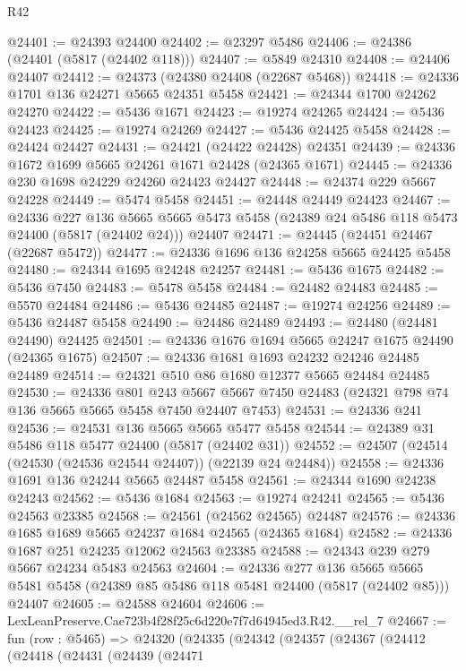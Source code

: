 \begin{lexlean}{R42}
\begin{coremodule}
@24401 := @24393 @24400
@24402 := @23297 @5486
@24406 := @24386 (@24401 (@5817 (@24402 @118)))
@24407 := @5849 @24310
@24408 := @24406 @24407
@24412 := @24373 (@24380 @24408 (@22687 @5468))
@24418 := @24336 @1701 @136 @24271 @5665 @24351 @5458
@24421 := @24344 @1700 @24262 @24270
@24422 := @5436 @1671
@24423 := @19274 @24265
@24424 := @5436 @24423
@24425 := @19274 @24269
@24427 := @5436 @24425 @5458
@24428 := @24424 @24427
@24431 := @24421 (@24422 @24428) @24351
@24439 := @24336 @1672 @1699 @5665 @24261 @1671 @24428 (@24365 @1671)
@24445 := @24336 @230 @1698 @24229 @24260 @24423 @24427
@24448 := @24374 @229 @5667 @24228
@24449 := @5474 @5458
@24451 := @24448 @24449 @24423
@24467 := @24336
    @227
    @136
    @5665
    @5665
    @5473
    @5458
    (@24389 @24 @5486 @118 @5473 @24400 (@5817 (@24402 @24)))
    @24407
@24471 := @24445 (@24451 @24467 (@22687 @5472))
@24477 := @24336 @1696 @136 @24258 @5665 @24425 @5458
@24480 := @24344 @1695 @24248 @24257
@24481 := @5436 @1675
@24482 := @5436 @7450
@24483 := @5478 @5458
@24484 := @24482 @24483
@24485 := @5570 @24484
@24486 := @5436 @24485
@24487 := @19274 @24256
@24489 := @5436 @24487 @5458
@24490 := @24486 @24489
@24493 := @24480 (@24481 @24490) @24425
@24501 := @24336 @1676 @1694 @5665 @24247 @1675 @24490 (@24365 @1675)
@24507 := @24336 @1681 @1693 @24232 @24246 @24485 @24489
@24514 := @24321 @510 @86 @1680 @12377 @5665 @24484 @24485
@24530 := @24336
    @801
    @243
    @5667
    @5667
    @7450
    @24483
    (@24321 @798 @74 @136 @5665 @5665 @5458 @7450 @24407 @7453)
@24531 := @24336 @241
@24536 := @24531 @136 @5665 @5665 @5477 @5458
@24544 := @24389 @31 @5486 @118 @5477 @24400 (@5817 (@24402 @31))
@24552 := @24507 (@24514 (@24530 (@24536 @24544 @24407)) (@22139 @24 @24484))
@24558 := @24336 @1691 @136 @24244 @5665 @24487 @5458
@24561 := @24344 @1690 @24238 @24243
@24562 := @5436 @1684
@24563 := @19274 @24241
@24565 := @5436 @24563 @23385
@24568 := @24561 (@24562 @24565) @24487
@24576 := @24336 @1685 @1689 @5665 @24237 @1684 @24565 (@24365 @1684)
@24582 := @24336 @1687 @251 @24235 @12062 @24563 @23385
@24588 := @24343 @239 @279 @5667 @24234 @5483 @24563
@24604 := @24336
    @277
    @136
    @5665
    @5665
    @5481
    @5458
    (@24389 @85 @5486 @118 @5481 @24400 (@5817 (@24402 @85)))
    @24407
@24605 := @24588 @24604
@24606 := LexLeanPreserve.Cae723b4f28f25c6d220e7f7d64945ed3.R42.__rel_7
@24667 := fun (row : @5465) =>
  @24320
    (@24335
      (@24342
        (@24357
          (@24367
            (@24412
              (@24418
                (@24431
                  (@24439
                    (@24471

\end{coremodule}
\end{lexlean}
